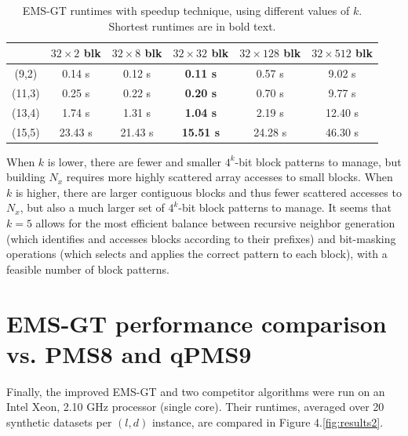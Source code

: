 \documentclass[oneside,12pt]{DISCSthesis}
\begin{document}
{\begin{table}[h]
\begin{tabular}{|c|c|c|c|c|c|}
			\bfseries &
			\bfseries\boldmath $32 \times   2$ blk &
			\bfseries\boldmath $32 \times   8$ blk &
			\bfseries\boldmath $32 \times  32$ blk &
			\bfseries\boldmath $32 \times 128$ blk &
			\bfseries\boldmath $32 \times 512$ blk \\
			\hline
			 (9,2) 	&  0.14 s &  0.12 s & {\bf  0.11 s} &  0.57 s &  9.02 s \\
			(11,3) 	&  0.25 s &  0.22 s & {\bf  0.20 s} &  0.70 s &  9.77 s \\
			(13,4) 	&  1.74 s &  1.31 s & {\bf  1.04 s} &  2.19 s & 12.40 s \\
			(15,5) 	& 23.43 s & 21.43 s & {\bf 15.51 s} & 24.28 s & 46.30 s \\
			\hline
			\end{tabular}
			\centering
			\caption{\small EMS-GT runtimes with speedup technique, using different values of $k$. Shortest runtimes are in bold text.}
			\end{table}

		When $k$ is lower, there are fewer and smaller $4^k$-bit block patterns to manage, but building $N_x$ requires more highly scattered array accesses to small blocks. When $k$ is higher, there are larger contiguous blocks and thus fewer scattered accesses to $N_x$, but also a much larger set of $4^k$-bit block patterns to manage. It seems that $k=5$ allows for the most efficient balance between recursive neighbor generation (which identifies and accesses blocks according to their prefixes) and bit-masking operations (which selects and applies the correct pattern to each block), with a feasible number of block patterns.

	\section{EMS-GT performance comparison vs. PMS8 and qPMS9}
		Finally, the improved EMS-GT and two competitor algorithms were run on an Intel Xeon, 2.10 GHz processor (single core). Their runtimes, averaged over 20 synthetic datasets per $(l,d)$ instance, are compared in Figure 4.\ref{fig:results2}.

}
\end{document}
